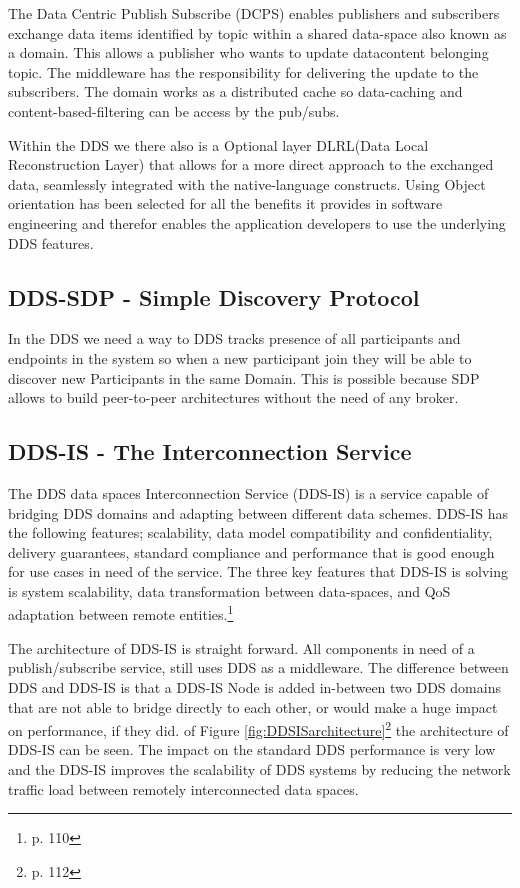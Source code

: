 The Data Centric Publish Subscribe (DCPS) enables publishers and subscribers exchange
data items identified by topic within a shared data-space also known as a domain. This allows a publisher who wants to update datacontent belonging topic. The middleware has the responsibility for delivering the update to the subscribers. The domain works as a distributed cache so data-caching and content-based-filtering can be access by the pub/subs.

Within the DDS we there also is a Optional layer DLRL(Data Local Reconstruction Layer) that allows for a more direct approach to the exchanged data, seamlessly integrated with the native-language
constructs. Using Object orientation has been selected for all the benefits it provides in software engineering and therefor enables the application developers to use the underlying DDS features.

\subsection{DDS-SDP - Simple Discovery Protocol}
In the DDS we need a way to DDS tracks presence of all participants and endpoints in the system so when a new participant join they will be able to discover new Participants in the same Domain. This is possible because SDP allows to build peer-to-peer architectures without the need of any broker. 

\subsection{DDS-IS - The Interconnection Service}
The DDS data spaces Interconnection Service (DDS-IS) is a service capable of bridging DDS domains and adapting between different data schemes. DDS-IS has the following features; scalability, data model compatibility and confidentiality, delivery guarantees, standard compliance and performance that is good enough for use cases in need of the service. The three key features that DDS-IS is solving is system scalability, data transformation between data-spaces, and QoS adaptation between remote entities.\footnote{\cite{Lopez-Vega2013} p. 110}

The architecture of DDS-IS is straight forward. All components in need of a publish/subscribe service, still uses DDS as a middleware. The difference between DDS and DDS-IS is that a DDS-IS Node is added in-between two DDS domains that are not able to bridge directly to each other, or would make a huge impact on performance, if they did. of Figure \ref{fig:DDSISarchitecture}\footnote{\cite{Lopez-Vega2013} p. 112} the architecture of DDS-IS can be seen. The impact on the standard DDS performance is very low and the DDS-IS improves the scalability of DDS systems by reducing the network traffic load between remotely interconnected data spaces.

